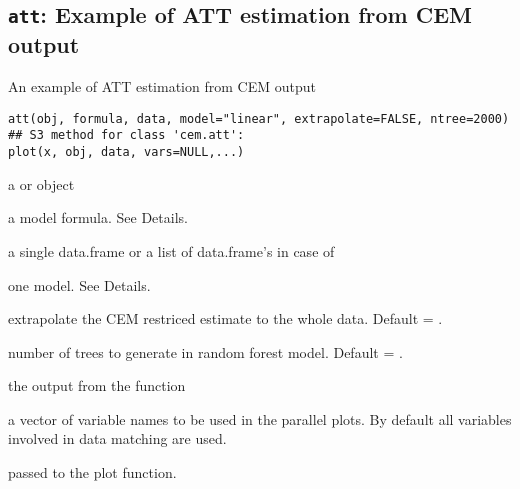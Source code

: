 \subsection{{\tt att}: Example of ATT estimation from CEM output}\label{ss:att}
\begin{Description}\relax
An example of ATT estimation from CEM output
\end{Description}
\begin{Usage}
\begin{verbatim}
att(obj, formula, data, model="linear", extrapolate=FALSE, ntree=2000)
## S3 method for class 'cem.att':
plot(x, obj, data, vars=NULL,...)
\end{verbatim}
\end{Usage}
\begin{Arguments}
\begin{ldescription}
\item[\code{obj}] a  or  object
\item[\code{formula}] a model formula. See Details.
\item[\code{data}] a single data.frame or a list of data.frame's in case of 
\item[\code{model}] one model. See Details.
\item[\code{extrapolate}] extrapolate the CEM restriced estimate to the whole data. Default = .
\item[\code{ntree}] number of trees to generate in random forest model. Default = .
\item[\code{x}] the output from the   function
\item[\code{vars}] a vector of variable names to be used in the parallel plots. By default all variables
involved in data matching are used.
\item[\code{...}] passed to the plot function.
\end{ldescription}
\end{Arguments}
